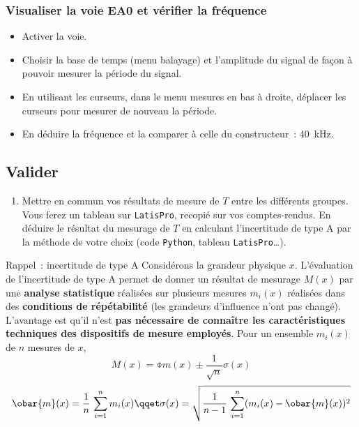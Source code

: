 \documentclass[a4paper, 11pt, final, garamond]{book}
\begin{document}
\subsubsection{Visualiser la voie EA0 et vérifier la fréquence}
\begin{itemize}
    \item Activer la voie.
    \item Choisir la base de temps (menu balayage) et l'amplitude du signal de
        façon à pouvoir mesurer la période du signal.
    \item En utilisant les curseurs, dans le menu mesures en bas à droite,
        déplacer les curseurs pour mesurer de nouveau la période.
    \item En déduire la fréquence et la comparer à celle du constructeur~:
        \SI{40}{kHz}.
\end{itemize}

\subsection{Valider}
\begin{enumerate}[label=\sqenumi, resume]
    \item Mettre en commun vos résultats de mesure de $T$ entre les différents
        groupes. Vous ferez un tableau sur \texttt{LatisPro}, recopié sur vos
        comptes-rendus. En déduire le résultat du mesurage de $T$ en calculant
        l'incertitude de type A par la méthode de votre choix (code
        \texttt{Python}, tableau \texttt{LatisPro}…).
\end{enumerate}

\begin{timpo}{Rappel~: incertitude de type A}
    Considérons la grandeur physique $x$. L'évaluation de l'incertitude de type
    A permet de donner un résultat de mesurage $M(x)$ par une \textbf{analyse
    statistique} réalisées sur plusieurs mesures $m_i(x)$ réalisées dans des
    \textbf{conditions de répétabilité} (les grandeurs d'influence n'ont pas
    changé). L'avantage est qu'il n'est \textbf{pas nécessaire de connaître
    les caractéristiques techniques des dispositifs de mesure employés}. Pour un
    ensemble $m_i(x)$ de $n$ mesures de $x$, 
    \[
        \boxed{M(x) = \obar{m}(x) \pm \frac{1}{\sqrt{n}} \sigma(x)}
    \]
    \[
        \obar{m}(x) = \frac{1}{n} \, \sum_{i=1}^{n} m_i(x)
        \qqet
        \sigma(x) = \sqrt{\frac{1}{n-1} \, \sum_{i=1}^{n} (m_i(x)-\obar{m}(x))^2}
    \]
\end{timpo}
\end{document}
